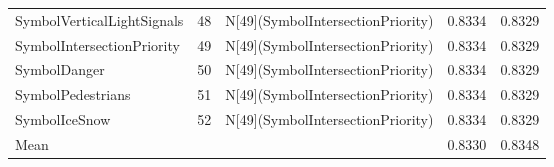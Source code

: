\begin{tabular}{lllll}
SymbolVerticalLightSignals & 48 & N[49](SymbolIntersectionPriority) & 0.8334 & 0.8329 \\
SymbolIntersectionPriority & 49 & N[49](SymbolIntersectionPriority) & 0.8334 & 0.8329 \\
SymbolDanger & 50 & N[49](SymbolIntersectionPriority) & 0.8334 & 0.8329 \\
SymbolPedestrians & 51 & N[49](SymbolIntersectionPriority) & 0.8334 & 0.8329 \\
SymbolIceSnow & 52 & N[49](SymbolIntersectionPriority) & 0.8334 & 0.8329 \\
Mean &  &  & 0.8330 & 0.8348 \\
\bottomrule
\end{tabular}
